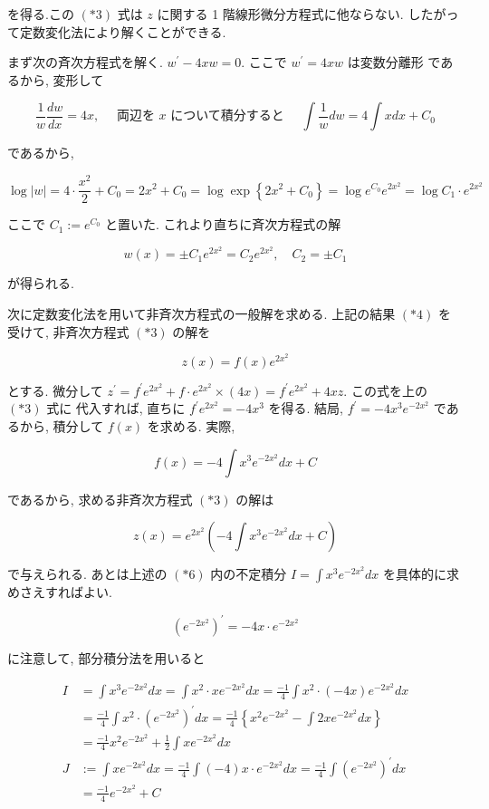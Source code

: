 \documentclass[10pt]{jsarticle}
\begin{document}
を得る.この $(* 3)$ 式は $z$ に関する 1 階線形微分方程式に他ならない. したがって定数変化法により解くことができる.

まず次の斉次方程式を解く. $w^{\prime}-4 x w=0$. ここで $w^{\prime}=4 x w$ は変数分離形 であるから, 変形して

$$
\frac{1}{w} \frac{d w}{d x}=4 x, \quad \text { 両辺を } x \text { について積分すると } \quad \int \frac{1}{w} d w=4 \int x d x+C_{0}
$$

であるから,

$$
\log |w|=4 \cdot \frac{x^{2}}{2}+C_{0}=2 x^{2}+C_{0}=\log \exp \left\{2 x^{2}+C_{0}\right\}=\log e^{C_{0}} e^{2 x^{2}}=\log C_{1} \cdot e^{2 x^{2}}
$$

ここで $C_{1}:=e^{C_{0}}$ と置いた. これより直ちに斉次方程式の解


\begin{equation*}
w(x)= \pm C_{1} e^{2 x^{2}}=C_{2} e^{2 x^{2}}, \quad C_{2}= \pm C_{1} \tag{*4}
\end{equation*}


が得られる.

次に定数変化法を用いて非斉次方程式の一般解を求める. 上記の結果 $(* 4)$ を 受けて, 非斉次方程式 $(* 3)$ の解を


\begin{equation*}
z(x)=f(x) e^{2 x^{2}} \tag{*5}
\end{equation*}


とする. 微分して $z^{\prime}=f^{\prime} e^{2 x^{2}}+f \cdot e^{2 x^{2}} \times(4 x)=f^{\prime} e^{2 x^{2}}+4 x z$. この式を上の $(* 3)$ 式に 代入すれば, 直ちに $f^{\prime} e^{2 x^{2}}=-4 x^{3}$ を得る. 結局, $f^{\prime}=-4 x^{3} e^{-2 x^{2}}$ であるから, 積分して $f(x)$ を求める. 実際,

$$
f(x)=-4 \int x^{3} e^{-2 x^{2}} d x+C
$$

であるから, 求める非斉次方程式 $(* 3)$ の解は


\begin{equation*}
z(x)=e^{2 x^{2}}\left(-4 \int x^{3} e^{-2 x^{2}} d x+C\right) \tag{*6}
\end{equation*}


で与えられる. あとは上述の $(* 6)$ 内の不定積分 $I=\int x^{3} e^{-2 x^{2}} d x$ を具体的に求めさえすればよい.

$$
\left(e^{-2 x^{2}}\right)^{\prime}=-4 x \cdot e^{-2 x^{2}}
$$

に注意して, 部分積分法を用いると


\begin{align*}
I & =\int x^{3} e^{-2 x^{2}} d x=\int x^{2} \cdot x e^{-2 x^{2}} d x=\frac{-1}{4} \int x^{2} \cdot(-4 x) e^{-2 x^{2}} d x \\
& =\frac{-1}{4} \int x^{2} \cdot\left(e^{-2 x^{2}}\right)^{\prime} d x=\frac{-1}{4}\left\{x^{2} e^{-2 x^{2}}-\int 2 x e^{-2 x^{2}} d x\right\} \\
& =\frac{-1}{4} x^{2} e^{-2 x^{2}}+\frac{1}{2} \int x e^{-2 x^{2}} d x  \tag{*7}\\
J & :=\int x e^{-2 x^{2}} d x=\frac{-1}{4} \int(-4) x \cdot e^{-2 x^{2}} d x=\frac{-1}{4} \int\left(e^{-2 x^{2}}\right)^{\prime} d x \\
& =\frac{-1}{4} e^{-2 x^{2}}+C \tag{*8}
\end{align*}
\end{document}
